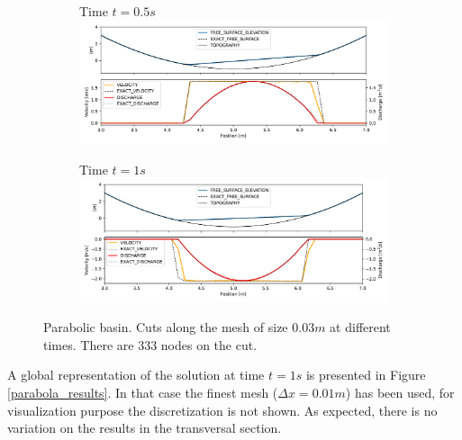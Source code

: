 \begin{figure}[H]
\begin{subfigure}{\textwidth}
    \centering
    Time $t=0.5s$
    \includegraphics[width=\textwidth]{img/eulerian/par/parabola_t0.5.pdf}
\end{subfigure}
\par\medskip
\begin{subfigure}{\textwidth}
    \centering
    Time $t=1s$
    \includegraphics[width=\textwidth]{img/eulerian/par/parabola_t1.0.pdf}
\end{subfigure}
\caption{Parabolic basin. Cuts along the mesh of size $0.03m$ at different times. There are 333 nodes on the cut.}
\label{parabola_graphic}
\end{figure}


A global representation of the solution at time $t=1s$ is presented in Figure \ref{parabola_results}.
In that case the finest mesh ($\Delta x=0.01m$) has been used, for visualization purpose the discretization is not shown. As expected, there is no variation on the results in the transversal section.


